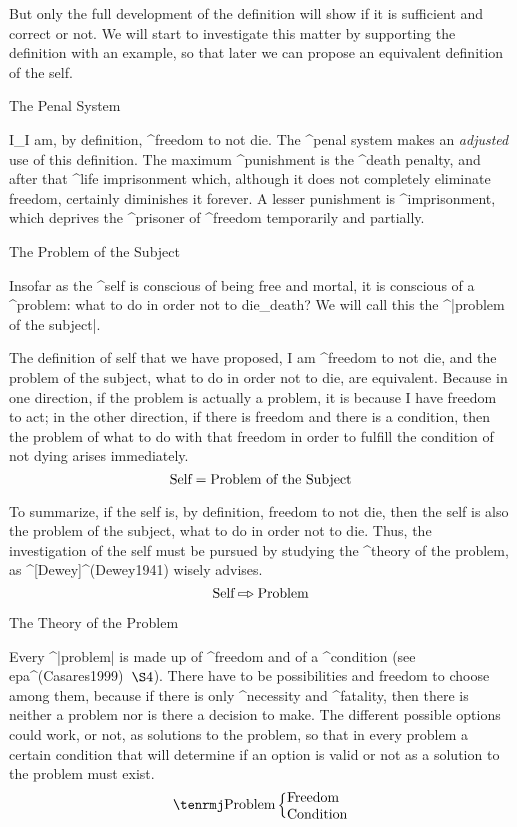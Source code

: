 
But only the full development of the definition will show if it is
sufficient and correct or not. We will start to investigate this matter
by supporting the definition with an example, so that later we can
propose an equivalent definition of the self.


\Section The Penal System

I_{I} am, by definition, ^{freedom} to not die. The ^{penal system}
makes an {\em adjusted} use of this definition. The maximum
^{punishment} is the ^{death} penalty, and after that ^{life
imprisonment} which, although it does not completely eliminate freedom,
certainly diminishes it forever. A lesser punishment is ^{imprisonment},
which deprives the ^{prisoner} of ^{freedom} temporarily and partially.


\Section The Problem of the Subject

Insofar as the ^{self} is conscious of being free and mortal, it is
conscious of a ^{problem}: what to do in order not to die_{death}? We
will call this the ^|problem of the subject|.

The definition of self that we have proposed, I am ^{freedom} to not
die, and the problem of the subject, what to do in order not to die, are
equivalent. Because in one direction, if the problem is actually a
problem, it is because I have freedom to act; in the other direction, if
there is freedom and there is a condition, then the problem of what to
do with that freedom in order to fulfill the condition of not dying
arises immediately.
$$\hbox{Self} = \hbox{Problem of the Subject}$$

To summarize, if the self is, by definition, freedom to not die, then
the self is also the problem of the subject, what to do in order not to
die. Thus, the investigation of the self must be pursued by studying the
^{theory of the problem}, as ^[Dewey]^(Dewey1941) wisely advises.
$$\hbox{Self} \etapa \hbox{Problem}$$


\Section The Theory of the Problem

Every ^|problem| is made up of ^{freedom} and of a ^{condition}
 (see {\sc epa}\kern-2pt^(Casares1999)\kern-1pt~$\S4$).
There have to be possibilities and freedom to choose among them, because
if there is only ^{necessity} and ^{fatality}, then there is neither a
problem nor is there a decision to make. The different possible options
could work, or not, as solutions to the problem, so that in every
problem a certain condition that will determine if an option is valid or
not as a solution to the problem must exist.
$$
\centerline{$\hbox{\rm Problem}
 \left\lbrace\vcenter{\hbox{Freedom}\hbox{Condition}}\right.$}
$$

